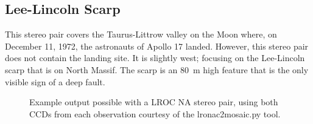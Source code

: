 \subsection{Lee-Lincoln Scarp}

This stereo pair covers the Taurus-Littrow valley on the Moon where,
on December 11, 1972, the astronauts of Apollo 17 landed. However,
this stereo pair does not contain the landing site.  It is slightly
west; focusing on the Lee-Lincoln scarp that is on North Massif. The
scarp is an 80~m high feature that is the only visible sign of a deep
fault.

\begin{figure}[h!]
\centering
  \hfil
\caption{Example output possible with a LROC NA stereo pair, using both CCDs from each observation courtesy of the lronac2mosaic.py tool.}
\label{fig:lroc-na-example}
\end{figure}

